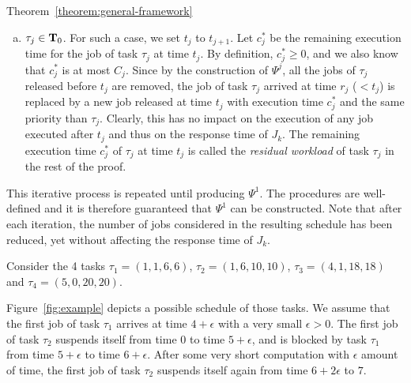 \begin{appProof}{Theorem~\ref{theorem:general-framework}}
\begin{enumerate}[(a)]
\begin{itemize}
Moreover, because no task with lower priority than $\tau_j$ executes jobs before $t_{j+1}$ in $\Psi^{j+1}$, removing the jobs released by $\tau_j$ before $t_{j+1}$ does not impact the schedule of the jobs of $\tau_{j+1}, \ldots, \tau_{k}$. Therefore, $t_j$ is set to $t_{j+1}$ and $\Psi^j$ is generated by removing all the jobs of task $\tau_j$ arrived before $t_{j+1}$. The response time of $J_{k}$ in $\Psi^j$ thus remains unchanged in comparison to its response time in $\Psi^{j+1}$.  
\end{itemize}
\item $\tau_j \in {\bf T}_0$. For such a case, we set $t_{j}$ to $t_{j+1}$. Let $c_j^*$ be the remaining execution time for the job of task $\tau_j$ at time $t_j$. By definition, $c_j^* \geq 0$, and we also know that $c_j^*$ is at most $C_j$. Since by the construction of $\Psi^j$, all the jobs of $\tau_j$ released before $t_j$ are removed, the job of task $\tau_j$ arrived at time $r_j$ ($< t_j$) is replaced by a new job released at time $t_j$ with execution time $c_j^*$ and the same priority than $\tau_j$. Clearly, this has no impact on the execution of any job executed after $t_j$ and thus on the response time of $J_k$. The remaining execution time $c_j^*$ of $\tau_j$ at time $t_j$ is called the \emph{residual workload} of task $\tau_j$ in the rest of the proof.
\end{enumerate}
 
This iterative process is repeated until producing $\Psi^1$. The procedures are well-defined and it is therefore guaranteed that $\Psi^1$ can be constructed. Note that after each iteration, the number of jobs considered in the resulting schedule has been reduced, yet without affecting the response time of $J_k$.

 


\begin{example}
\label{ex:proof_step1}
Consider the 4 tasks $\tau_1 =(1,1,6,6)$, $\tau_2 =(1,6,10,10)$, $\tau_3 =(4,1,18,18)$ and $\tau_4 =(5,0,20,20)$.

Figure~\ref{fig:example} depicts a possible schedule of those tasks. We assume that the first job of task $\tau_1$ arrives
at time $4+\epsilon$ with a very small $\epsilon > 0$. The first job
of task $\tau_2$ suspends itself from time $0$ to time $5+\epsilon$,
and is blocked by task $\tau_1$ from time $5+\epsilon$ to time
$6+\epsilon$. After some very short computation with $\epsilon$ amount
of time, the first job of task $\tau_2$ suspends itself again from
time $6+2\epsilon$ to $7$. 
   

\end{example}
\end{appProof}
